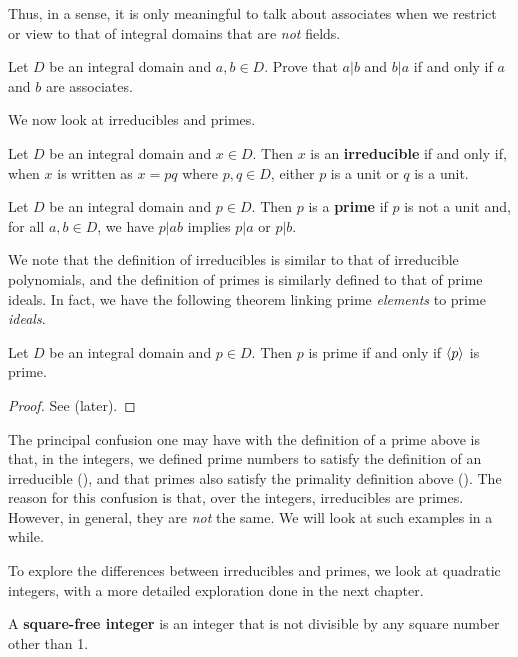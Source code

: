 Thus, in a sense, it is only meaningful to talk about associates when we restrict or view to that of integral domains that are \textit{not} fields.

\begin{exercise}
    Let $D$ be an integral domain and $a,b \in D$. Prove that $a \vert b$ and $b \vert a$ if and only if $a$ and $b$ are associates.
\end{exercise}

We now look at irreducibles and primes.
\begin{definition}
    Let $D$ be an integral domain and $x \in D$. Then $x$ is an \textbf{irreducible} if and only if, when $x$ is written as $x = pq$ where $p, q \in D$, either $p$ is a unit or $q$ is a unit.
\end{definition}
\begin{definition}
    Let $D$ be an integral domain and $p \in D$. Then $p$ is a \textbf{prime} if $p$ is not a unit and, for all $a, b \in D$, we have $p \vert ab$ implies $p \vert a$ or $p \vert b$.
\end{definition}

We note that the definition of irreducibles is similar to that of irreducible polynomials, and the definition of primes is similarly defined to that of prime ideals. In fact, we have the following theorem linking prime \textit{elements} to prime \textit{ideals}.
\begin{theorem}\label{thrm-prime-element-iff-generates-prime-ideal}
    Let $D$ be an integral domain and $p \in D$. Then $p$ is prime if and only if $\left\langle p\right\rangle$ is prime.
\end{theorem}
\begin{proof}
    See  (later).
\end{proof}

The principal confusion one may have with the definition of a prime above is that, in the integers, we defined prime numbers to satisfy the definition of an irreducible (), and that primes also satisfy the primality definition above (). The reason for this confusion is that, over the integers, irreducibles are primes. However, in general, they are \textit{not} the same. We will look at such examples in a while.

To explore the differences between irreducibles and primes, we look at quadratic integers, with a more detailed exploration done in the next chapter.
\begin{definition}
    A \textbf{square-free integer} is an integer that is not divisible by any square number other than 1.
\end{definition}


